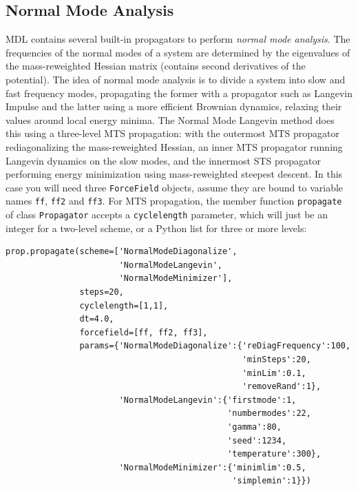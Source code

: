 \documentclass[11pt]{report}
\begin{document}
\subsection{Normal Mode Analysis}

MDL contains several built-in propagators to perform {\it normal
mode analysis}.  The frequencies of the normal modes of a system
are determined by the eigenvalues of the mass-reweighted Hessian
matrix (contains second derivatives of the potential).  The idea
of normal mode analysis is to divide a system into slow and fast
frequency modes, propagating the former with a propagator such
as Langevin Impulse and the latter using a more efficient Brownian
dynamics, relaxing their values around local energy minima.
The Normal Mode Langevin \cite{SPPI08} method does this using a 
three-level MTS propagation: with the outermost MTS propagator 
rediagonalizing the mass-reweighted Hessian, an inner MTS propagator
running Langevin dynamics on the slow modes, and the innermost
STS propagator performing energy minimization using mass-reweighted
steepest descent.  In this case you will need three \texttt{ForceField}
objects, assume they are bound to variable names \texttt{ff}, \texttt{ff2}
and \texttt{ff3}.  For MTS propagation, the member function \texttt{propagate}
of class \texttt{Propagator} accepts a \texttt{cyclelength} parameter, which will just
be an integer for a two-level scheme, or a Python list for three or more levels:

\begin{verbatim}
prop.propagate(scheme=['NormalModeDiagonalize', 
                       'NormalModeLangevin', 
                       'NormalModeMinimizer'],
               steps=20,
               cyclelength=[1,1],
               dt=4.0,
               forcefield=[ff, ff2, ff3],
               params={'NormalModeDiagonalize':{'reDiagFrequency':100,
                                                'minSteps':20,
                                                'minLim':0.1,
                                                'removeRand':1},
                       'NormalModeLangevin':{'firstmode':1,
                                             'numbermodes':22,
                                             'gamma':80,
                                             'seed':1234,
                                             'temperature':300},
                       'NormalModeMinimizer':{'minimlim':0.5,
                                              'simplemin':1}})
\end{verbatim}
\end{document}
